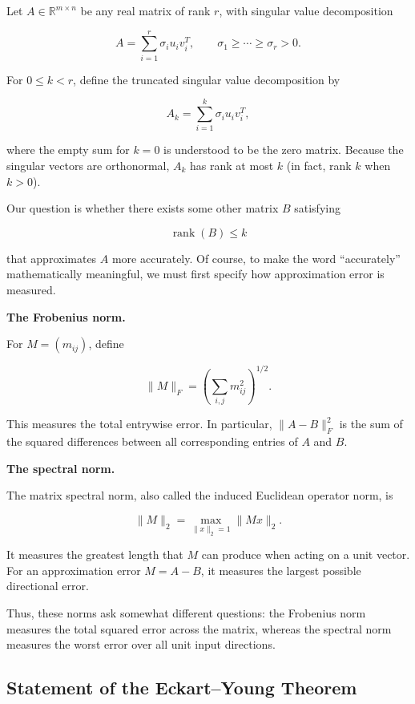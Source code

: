 \documentclass[11pt]{article}
\begin{document}
Let $A\in\mathbb{R}^{m\times n}$ be any
real matrix of rank $r$, with singular
value decomposition

\[
A=\sum_{i=1}^{r}\sigma_i u_i v_i^T,
\qquad
\sigma_1\geq\cdots\geq\sigma_r>0.
\]

For $0\leq k<r$, define the truncated
singular value decomposition by

\[
\boxed{
A_k=\sum_{i=1}^{k}\sigma_i u_i v_i^T,
}
\]

where the empty sum for $k=0$ is understood
to be the zero matrix. Because the singular
vectors are orthonormal, $A_k$ has rank
at most $k$ (in fact, rank $k$ when $k>0$).

Our question is whether there exists
some other matrix $B$ satisfying

\[
\operatorname{rank}(B)\leq k
\]

that approximates $A$ more accurately.
Of course, to make the word ``accurately''
mathematically meaningful, we must first
specify how approximation error is measured.

\textbf{The Frobenius norm.}

For $M=(m_{ij})$, define

\[
\boxed{
\|M\|_F
=\left(\sum_{i,j}m_{ij}^{2}\right)^{1/2}.
}
\]

This measures the total entrywise error.
In particular, $\|A-B\|_F^2$ is the sum
of the squared differences between all
corresponding entries of $A$ and $B$.

\textbf{The spectral norm.}

The matrix spectral norm, also called
the induced Euclidean operator norm, is

\[
\boxed{
\|M\|_2
=\max_{\|x\|_2=1}\|Mx\|_2.
}
\]

It measures the greatest length that
$M$ can produce when acting on a unit
vector. For an approximation error
$M=A-B$, it measures the largest
possible directional error.

Thus, these norms ask somewhat different
questions: the Frobenius norm measures
the total squared error across the matrix,
whereas the spectral norm measures the
worst error over all unit input directions.

\subsection{Statement of the Eckart--Young Theorem}
\end{document}
